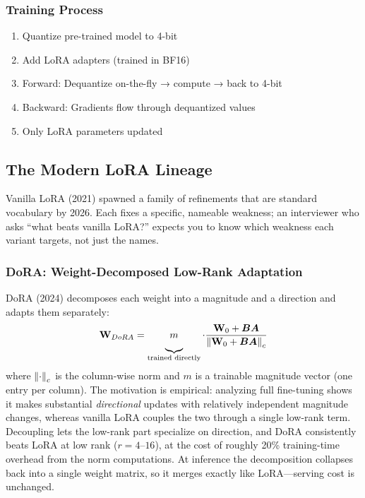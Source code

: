 \subsubsection{Training Process}

\begin{enumerate}
    \item Quantize pre-trained model to 4-bit
    \item Add LoRA adapters (trained in BF16)
    \item Forward: Dequantize on-the-fly → compute → back to 4-bit
    \item Backward: Gradients flow through dequantized values
    \item Only LoRA parameters updated
\end{enumerate}

\subsection{The Modern LoRA Lineage}
\label{subsec:lora_lineage}

Vanilla LoRA (2021) spawned a family of refinements that are standard vocabulary by 2026. Each fixes a specific, nameable weakness; an interviewer who asks ``what beats vanilla LoRA?'' expects you to know which weakness each variant targets, not just the names.

\subsubsection{DoRA: Weight-Decomposed Low-Rank Adaptation}

DoRA (2024) decomposes each weight into a magnitude and a direction and adapts them separately:
\begin{equation}
\mW_{DoRA} = \underbrace{\vphantom{\frac{\mW_0}{\norm{\mW_0}}}m}_{\text{trained directly}} \cdot \frac{\mW_0 + \mB\mA}{\norm{\mW_0 + \mB\mA}_c}
\end{equation}
where $\left\lVert\cdot\right\rVert_c$ is the column-wise norm and $m$ is a trainable magnitude vector (one entry per column). The motivation is empirical: analyzing full fine-tuning shows it makes substantial \emph{directional} updates with relatively independent magnitude changes, whereas vanilla LoRA couples the two through a single low-rank term. Decoupling lets the low-rank part specialize on direction, and DoRA consistently beats LoRA at low rank ($r = 4$--$16$), at the cost of roughly 20\% training-time overhead from the norm computations. At inference the decomposition collapses back into a single weight matrix, so it merges exactly like LoRA---serving cost is unchanged.

